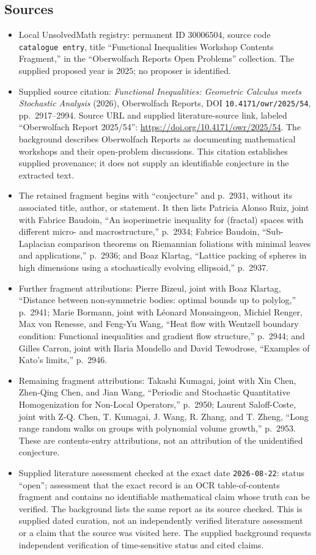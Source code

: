 \documentclass[11pt]{article}
\begin{document}
\subsection{Sources}
\begin{itemize}
\item Local UnsolvedMath registry: permanent ID \(30006504\), source code \texttt{catalogue entry}, title ``Functional Inequalities Workshop Contents Fragment,'' in the ``Oberwolfach Reports Open Problems'' collection. The supplied proposed year is \(2025\); no proposer is identified.
\item Supplied source citation: \emph{Functional Inequalities: Geometric Calculus meets Stochastic Analysis} (2026), Oberwolfach Reports, DOI \texttt{10.4171/owr/2025/54}, pp.~2917--2994. Source URL and supplied literature-source link, labeled ``Oberwolfach Report 2025/54'': \url{https://doi.org/10.4171/owr/2025/54}. The background describes Oberwolfach Reports as documenting mathematical workshops and their open-problem discussions. This citation establishes supplied provenance; it does not supply an identifiable conjecture in the extracted text.
\item The retained fragment begins with ``conjecture'' and p.~2931, without its associated title, author, or statement. It then lists Patricia Alonso Ruiz, joint with Fabrice Baudoin, ``An isoperimetric inequality for (fractal) spaces with different micro- and macrostructure,'' p.~2934; Fabrice Baudoin, ``Sub-Laplacian comparison theorems on Riemannian foliations with minimal leaves and applications,'' p.~2936; and Boaz Klartag, ``Lattice packing of spheres in high dimensions using a stochastically evolving ellipsoid,'' p.~2937.
\item Further fragment attributions: Pierre Bizeul, joint with Boaz Klartag, ``Distance between non-symmetric bodies: optimal bounds up to polylog,'' p.~2941; Marie Bormann, joint with Léonard Monsaingeon, Michiel Renger, Max von Renesse, and Feng-Yu Wang, ``Heat flow with Wentzell boundary condition: Functional inequalities and gradient flow structure,'' p.~2944; and Gilles Carron, joint with Ilaria Mondello and David Tewodrose, ``Examples of Kato's limits,'' p.~2946.
\item Remaining fragment attributions: Takashi Kumagai, joint with Xin Chen, Zhen-Qing Chen, and Jian Wang, ``Periodic and Stochastic Quantitative Homogenization for Non-Local Operators,'' p.~2950; Laurent Saloff-Coste, joint with Z-Q. Chen, T. Kumagai, J. Wang, R. Zhang, and T. Zheng, ``Long range random walks on groups with polynomial volume growth,'' p.~2953. These are contents-entry attributions, not an attribution of the unidentified conjecture.
\item Supplied literature assessment checked at the exact date \texttt{2026-08-22}: status ``open''; assessment that the exact record is an OCR table-of-contents fragment and contains no identifiable mathematical claim whose truth can be verified. The background lists the same report as its source checked. This is supplied dated curation, not an independently verified literature assessment or a claim that the source was visited here. The supplied background requests independent verification of time-sensitive status and cited claims.
\end{itemize}
\end{document}

